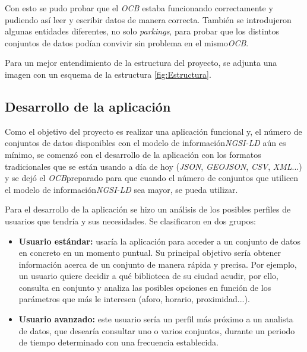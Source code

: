\label{fig:get-postman}


Con esto se pudo probar que el \textit{OCB}\footnotemark{} estaba funcionando correctamente y pudiendo así leer y escribir datos de manera correcta. También se introdujeron algunas entidades diferentes, no solo \textit{parkings}, para probar que los distintos conjuntos de datos podían convivir sin problema en el mismo\textit{OCB}\footnotemark[\value{footnote}]. 


Para un mejor entendimiento de la estructura del proyecto, se adjunta una imagen con un esquema de la estructura \ref{fig:Estructura}.


\subsection{Desarrollo de la aplicación}

Como el objetivo del proyecto es realizar una aplicación funcional y, el número de conjuntos de datos disponibles con el modelo de información\textit{NGSI-LD} aún es mínimo, se comenzó con el desarrollo de la aplicación con los formatos tradicionales que se están usando a día de hoy (\textit{JSON}, \textit{GEOJSON}, \textit{CSV}, \textit{XML}...) y se dejó el \textit{OCB}\footnotemark[\value{footnote}] preparado para que cuando el número de conjuntos que utilicen el modelo de información\textit{NGSI-LD} sea mayor, se pueda utilizar.

Para el desarrollo de la aplicación se hizo un análisis de los posibles perfiles de usuarios que tendría y sus necesidades. Se clasificaron en dos grupos:

\begin{itemize}
    \item \textbf{Usuario estándar:} usaría la aplicación para acceder a un conjunto de datos en concreto en un momento puntual. Su principal objetivo sería obtener información acerca de un conjunto de manera rápida y precisa. Por ejemplo, un usuario quiere decidir a qué biblioteca de su ciudad acudir, por ello, consulta en conjunto y analiza las posibles opciones en función de los parámetros que más le interesen (aforo, horario, proximidad...).
    \item \textbf{Usuario avanzado:} este usuario sería un perfil más próximo a un analista de datos, que desearía consultar uno o varios conjuntos, durante un periodo de tiempo determinado con una frecuencia establecida.
\end{itemize}


